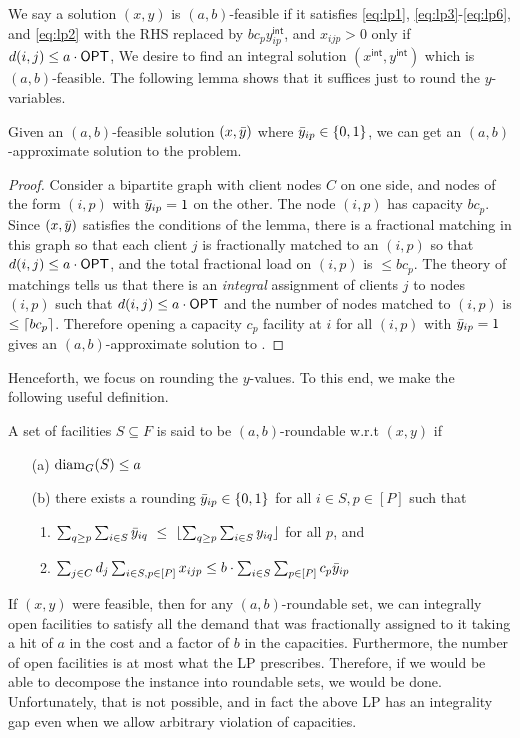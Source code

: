 \noindent		
We say a solution $(x,y)$ is $(a,b)$-feasible if it satisfies \eqref{eq:lp1}, \eqref{eq:lp3}-\eqref{eq:lp6}, and \eqref{eq:lp2} with the RHS replaced by $bc_py^\mathsf{int}_{ip}$, and $x_{ijp} > 0$ only if $d(i,j) \leq a\cdot \mathsf{OPT}$,
We desire to find an integral solution $(x^\mathsf{int},y^\mathsf{int})$ which is $(a,b)$-feasible.
The following lemma shows that it suffices just to round the $y$-variables.
\begin{claim}
Given an $(a,b)$-feasible solution $(x,\bar{y})$ where $\bar{y}_{ip}\in \{0,1\}$,  
we can get  an $(a,b)$-approximate solution to the \mckc problem.
\end{claim}
\begin{proof}
Consider a bipartite graph with client nodes $C$ on one side, and nodes of the form $(i,p)$ with $\bar{y}_{ip} = 1$ on the other. The node $(i,p)$ has capacity $bc_p$.
Since $(x,\bar{y})$ satisfies the conditions of the lemma, there is a fractional matching in this graph so that each client $j$  is fractionally matched to an $(i,p)$ so that $d(i,j)\leq a\cdot \mathsf{OPT}$,
and the total fractional load on $(i,p)$ is $\leq bc_p$. The theory of matchings tells us that there is an {\em integral} assignment of clients $j$ to nodes $(i,p)$ such that $d(i,j)\leq a\cdot\mathsf{OPT}$
and the number of nodes matched to $(i,p)$ is $\leq \lceil bc_p\rceil$. Therefore opening a capacity $c_p$ facility at $i$ for all $(i,p)$ with $\bar{y}_{ip} = 1$ gives an $(a,b)$-approximate solution to \mckc.
\end{proof}
\noindent
Henceforth, we focus on rounding the $y$-values. To this end, we make the following useful definition.
\begin{definition}\label{def:rnding-mkc}
	A set of facilities $S\subseteq F$ is said to be $(a,b)$-roundable w.r.t $(x,y)$ if
	\begin{itemize}[noitemsep]
		\item[(a)] $\mathrm{diam}_G(S) \leq a$
		\item[(b)] there exists a rounding $\bar{y}_{ip} \in \{0,1\}$ for all $i \in S, p\in [P]$ such that
		\begin{enumerate}
			\item $\sum_{q \geq p} \sum_{i\in S} \bar{y}_{iq} ~\leq~ \lfloor\sum_{q \geq p}\sum_{i\in S} y_{iq}\rfloor$ for all $p$, and
			\item $\sum_{j\in C} d_j \sum_{i\in S,p\in [P]} x_{ijp} \leq b\cdot \sum_{i\in S} \sum_{p\in [P]} c_p \bar{y}_{ip}$
		\end{enumerate}
	\end{itemize}
\end{definition}
\noindent
If $(x,y)$ were feasible, then for any $(a,b)$-roundable set, we can integrally open facilities to satisfy all the demand that was fractionally assigned to it taking a hit of $a$ in the cost and a factor of $b$ in the capacities. Furthermore, the number of open facilities is at most what the LP prescribes. Therefore, if we would be able to decompose the instance into roundable sets, we would be done.
Unfortunately, that is not possible, and in fact the above LP has an integrality gap even when we allow arbitrary violation of capacities. 

